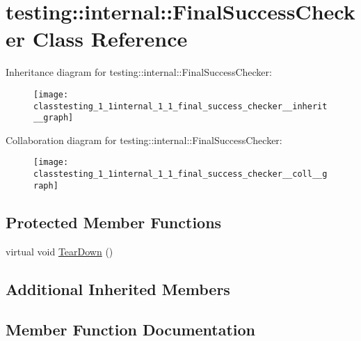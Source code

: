 \hypertarget{classtesting_1_1internal_1_1_final_success_checker}{}\section{testing\+:\+:internal\+:\+:Final\+Success\+Checker Class Reference}
\label{classtesting_1_1internal_1_1_final_success_checker}


Inheritance diagram for testing\+:\+:internal\+:\+:Final\+Success\+Checker\+:
\nopagebreak
\begin{figure}[H]
\begin{center}
\leavevmode
\texttt{[image: classtesting\_1\_1internal\_1\_1\_final\_success\_checker\_\_inherit\_\_graph]}
\end{center}
\end{figure}


Collaboration diagram for testing\+:\+:internal\+:\+:Final\+Success\+Checker\+:
\nopagebreak
\begin{figure}[H]
\begin{center}
\leavevmode
\texttt{[image: classtesting\_1\_1internal\_1\_1\_final\_success\_checker\_\_coll\_\_graph]}
\end{center}
\end{figure}
\subsection*{Protected Member Functions}
\begin{DoxyCompactItemize}
\item 
virtual void \hyperlink{classtesting_1_1internal_1_1_final_success_checker_a8f39d12a1f2bfe8c6c04b5c6749382c9}{Tear\+Down} ()
\end{DoxyCompactItemize}
\subsection*{Additional Inherited Members}


\subsection{Member Function Documentation}
